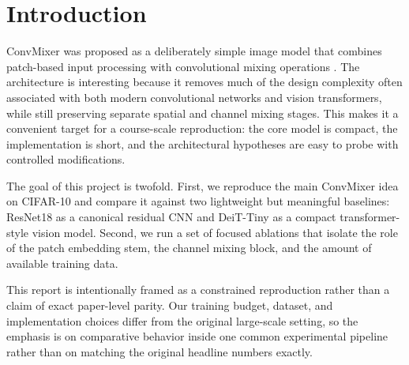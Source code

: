 \section{Introduction}

ConvMixer was proposed as a deliberately simple image model that combines patch-based input processing with convolutional mixing operations \citep{trockman2022patches}. The architecture is interesting because it removes much of the design complexity often associated with both modern convolutional networks and vision transformers, while still preserving separate spatial and channel mixing stages. This makes it a convenient target for a course-scale reproduction: the core model is compact, the implementation is short, and the architectural hypotheses are easy to probe with controlled modifications.

The goal of this project is twofold. First, we reproduce the main ConvMixer idea on CIFAR-10 and compare it against two lightweight but meaningful baselines: ResNet18 as a canonical residual CNN and DeiT-Tiny as a compact transformer-style vision model. Second, we run a set of focused ablations that isolate the role of the patch embedding stem, the channel mixing block, and the amount of available training data.

This report is intentionally framed as a constrained reproduction rather than a claim of exact paper-level parity. Our training budget, dataset, and implementation choices differ from the original large-scale setting, so the emphasis is on comparative behavior inside one common experimental pipeline rather than on matching the original headline numbers exactly.

